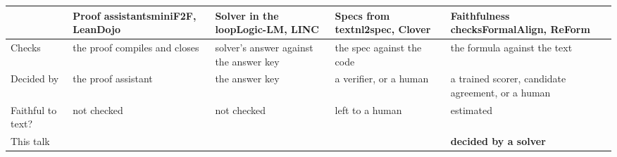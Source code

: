 \documentclass[border=8pt,12pt]{standalone}
\begin{document}
\renewcommand{\arraystretch}{1.25}
\setlength{\tabcolsep}{4pt}
\setlength{\extrarowheight}{2pt}
\setlength{\arrayrulewidth}{0.6pt}
\begin{tabular}{|L|C{3.5cm}|C{3.4cm}|C{3.1cm}|C{3.9cm}|}
\hline
{}
 & \textbf{Proof assistants}\newline\textcolor{black!60}{miniF2F, LeanDojo} & \textbf{Solver in the loop}\newline\textcolor{black!60}{Logic-LM, LINC} & \textbf{Specs from text}\newline\textcolor{black!60}{nl2spec, Clover} & \textbf{Faithfulness checks}\newline\textcolor{black!60}{FormalAlign, ReForm} \\
\hline
{}\textcolor{black!55}{Checks} & the proof compiles and closes & solver's answer against the answer key & the spec against the code & the formula against the text \\
\hline
{}\textcolor{black!55}{Decided by} & the proof assistant & the answer key & a verifier, or a human & a trained scorer, candidate agreement, or a human \\
\hline
{}\textcolor{black!55}{Faithful to text?} & not checked & not checked & left to a human & estimated \\
\hline
{}\textcolor{black!55}{This talk} &  & \textbf{decided by a solver} \\
\hline
\end{tabular}
\end{document}
